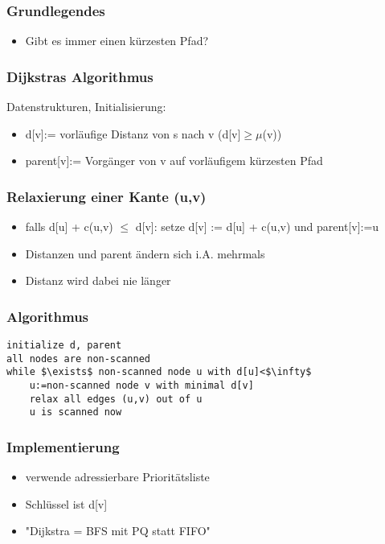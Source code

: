 \begin{frame}
\frametitle{Grundlegendes}
\begin{itemize}
\item Gibt es immer einen kürzesten Pfad? 
 
 
\end{itemize}
\end{frame}

\begin{frame}
\frametitle{Dijkstras Algorithmus}
Datenstrukturen, Initialisierung:
\begin{itemize}
\item d[v]:= vorläufige Distanz von s nach v (d[v]$\geq\mu$(v))
\item parent[v]:= Vorgänger von v auf vorläufigem kürzesten Pfad
\end{itemize}
\end{frame}

\begin{frame}
\frametitle{Relaxierung einer Kante (u,v)}
\begin{itemize}
\item falls d[u] + c(u,v) $\leq$ d[v]: setze d[v] := d[u] + c(u,v) und parent[v]:=u\pause
\item Distanzen und parent ändern sich i.A. mehrmals\pause
\item Distanz wird dabei nie länger
\end{itemize}
\end{frame}

\begin{frame}[fragile]
\frametitle{Algorithmus}
\begin{lstlisting}
initialize d, parent
all nodes are non-scanned
while $\exists$ non-scanned node u with d[u]<$\infty$
    u:=non-scanned node v with minimal d[v]
    relax all edges (u,v) out of u
    u is scanned now
\end{lstlisting}
\end{frame}

\begin{frame}
\frametitle{Implementierung}
\begin{itemize}
\item verwende adressierbare Prioritätsliste
\item Schlüssel ist d[v]\pause
\item "Dijkstra = BFS mit PQ statt FIFO"
\end{itemize}
\end{frame}

